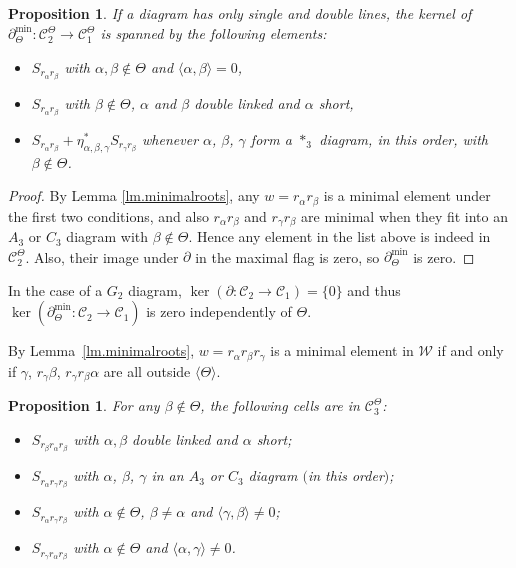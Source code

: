 \documentclass[pdftex]{sigma}
\numberwithin{equation}{section}
\newtheorem{Proposition}[Theorem]{Proposition}
 { \theoremstyle{definition}
\newtheorem{Definition}[Theorem]{Definition}
\newtheorem{Note}[Theorem]{Note}
\newtheorem{Example}[Theorem]{Example}
\newtheorem{Remark}[Theorem]{Remark} }
\begin{document}
\begin{Proposition}If a diagram has only single and double lines, the kernel of $\partial_\Theta^{\min}\colon \mathcal{C}_2^\Theta\longrightarrow \mathcal{C}_1^\Theta$ is spanned by the following elements:
\begin{itemize}\itemsep=0pt
\item $S_{r_\alpha r_\beta}$ with $\alpha,\beta\notin\Theta$ and $\langle\alpha, \beta \rangle=0$,
\item $S_{r_\alpha r_\beta}$ with $\beta\notin \Theta$, $\alpha$ and $\beta$ double linked and $\alpha$ short,
\item $S_{r_\alpha r_\beta}+ \eta^*_{\alpha,\beta,\gamma} S_{r_\gamma r_\beta}$ whenever $\alpha$, $\beta$, $\gamma$ form a $*_3$ diagram, in this order, with $\beta\notin \Theta$.
\end{itemize}
\end{Proposition}

\begin{proof}By Lemma \ref{lm.minimalroots}, any $w=r_{\alpha }r_{\beta }$ is a minimal element under the first two conditions, and also $r_{\alpha }r_{\beta }$ and $r_{\gamma }r_{\beta }$ are minimal when they fit into an $A_{3}$ or $C_{3}$ diagram with $\beta \notin \Theta $. Hence any element in the list above is indeed in $\mathcal{C}_{2}^{\Theta }$. Also, their image under $\partial $ in the maximal flag is zero, so $\partial _{\Theta }^{\min }$ is zero.
\end{proof}

In the case of a $G_2$ diagram, $\ker (\partial\colon \mathcal{C}_2\longrightarrow\mathcal{C}_1)=\{0\}$ and thus $\ker (\partial_\Theta^{\min}\colon \mathcal{C}_2\longrightarrow\mathcal{C}_1)$ is zero independently of $\Theta$.

By Lemma~\ref{lm.minimalroots}, $w= r_\alpha r_\beta r_\gamma$ is a minimal element in $\mathcal{W}$ if and only if $\gamma$, $r_\gamma\beta$, $r_\gamma r_\beta\alpha$ are all
outside $ \langle \Theta \rangle$.

\begin{Proposition}\label{pro.minimal3}For any $\beta \notin \Theta $, the following cells are in $\mathcal{C}_{3}^{\Theta }$:
\begin{itemize}\itemsep=0pt
\item $S_{r_\beta r_\alpha r_\beta}$ with $\alpha, \beta$ double linked and $\alpha$ short;

\item $S_{ r_{\alpha }r_{\gamma }r_{\beta }}$ with $\alpha$, $\beta$, $\gamma$ in an $A_{3}$ or $C_3$ diagram $($in this order$)$;

\item $S_{ r_{\alpha }r_{\gamma }r_{\beta }}$ with $\alpha\notin \Theta$, $\beta\neq \alpha$ and $ \langle \gamma, \beta \rangle\neq 0$;

\item $S_{r_{\gamma }r_{\alpha }r_{\beta }}$ with $\alpha\notin \Theta$ and $ \langle \alpha, \gamma \rangle\neq 0$.
\end{itemize}
\end{Proposition}
\end{document}
